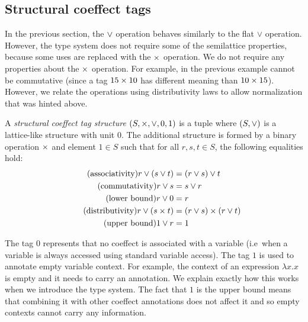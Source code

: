 
\subsection{Structural coeffect tags}
In the previous section, the $\vee$ operation behaves similarly to the flat $\vee$ operation.
However, the type system does not require some of the semilattice properties, because some uses
are replaced with the $\times$ operation. We do not require any properties about the $\times$ operation.
For example, in the previous example cannot be commutative (since a tag $15 \times 10$ has different 
meaning than $10 \times 15$). However, we relate the operations using distributivity laws to allow 
normalization that was hinted above.

\begin{definition}
A \emph{structural coeffect tag structure} $(S, \times, \vee, 0, 1)$ is a tuple where 
$(S, \vee)$ is a lattice-like structure with unit $0$. The additional structure is formed
by a binary operation $\times$ and element $1\in S$ such that
for all $r,s,t\in S$, the following equalities hold: 
%
\begin{subequations}
\begin{align}
\tag{associativity}
r \vee (s \vee t) &= (r \vee s) \vee t\\
\tag{commutativity}
r \vee s &= s \vee r\\
\tag{lower bound}
r \vee 0 &= r\\
\tag{distributivity}
r \vee (s \times t) &= (r \vee s) \times (r \vee t)\\
\tag{upper bound}
1 \vee r &= 1
\end{align}
\end{subequations}
%
\end{definition}
%
%
%
The tag $0$ represents that no coeffect is associated with a variable (i.e~when a variable is
always accessed using standard variable access). The tag $1$ is used to annotate empty 
variable context. For example, the context of an expression $\lambda x.x$ is empty and it needs
to carry an annotation. We explain exactly how this works when we introduce the type system.
The fact that $1$ is the upper bound means that combining it with other coeffect annotations
does not affect it and so empty contexts cannot carry any information.

